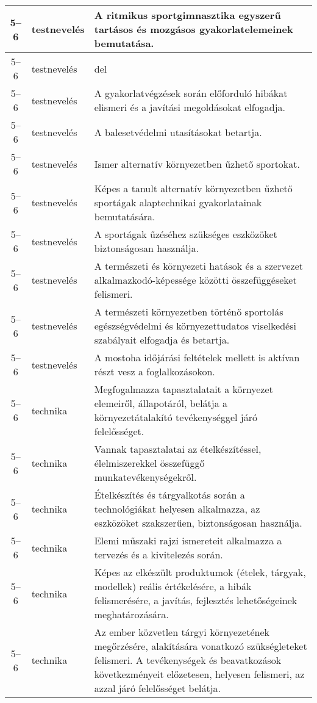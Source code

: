 \begin{small}
\begin{longtable}{c | p{2cm} |  p{11cm} }
              5--6 & testnevelés & A ritmikus sportgimnasztika egyszerű tartásos és mozgásos gyakorlatelemeinek bemutatása. \\ \hline
              5--6 & testnevelés & del
 \\ \hline
              5--6 & testnevelés & A gyakorlatvégzések során előforduló hibákat elismeri és a javítási megoldásokat elfogadja. \\ \hline
              5--6 & testnevelés & A balesetvédelmi utasításokat betartja. \\ \hline
              5--6 & testnevelés & Ismer alternatív környezetben űzhető sportokat. \\ \hline
              5--6 & testnevelés & Képes a tanult alternatív környezetben űzhető sportágak alaptechnikai gyakorlatainak bemutatására. \\ \hline
              5--6 & testnevelés & A sportágak űzéséhez szükséges eszközöket biztonságosan használja. \\ \hline
              5--6 & testnevelés & A természeti és környezeti hatások és a szervezet alkalmazkodó-képessége közötti összefüggéseket felismeri. \\ \hline
              5--6 & testnevelés & A természeti környezetben történő sportolás egészségvédelmi és környezettudatos viselkedési szabályait elfogadja és betartja. \\ \hline
              5--6 & testnevelés & A mostoha időjárási feltételek mellett is aktívan részt vesz a foglalkozásokon. \\ \hline
              5--6 & technika & Megfogalmazza tapasztalatait a környezet elemeiről, állapotáról, belátja a környezetátalakító tevékenységgel járó felelősséget. \\ \hline
              5--6 & technika & Vannak tapasztalatai az ételkészítéssel, élelmiszerekkel összefüggő munkatevékenységekről. \\ \hline
              5--6 & technika & Ételkészítés és tárgyalkotás során a technológiákat helyesen alkalmazza, az eszközöket szakszerűen, biztonságosan használja. \\ \hline
              5--6 & technika & Elemi műszaki rajzi ismereteit alkalmazza a tervezés és a kivitelezés során. \\ \hline
              5--6 & technika & Képes az elkészült produktumok (ételek, tárgyak, modellek) reális értékelésére, a hibák felismerésére, a javítás, fejlesztés lehetőségeinek meghatározására. \\ \hline
              5--6 & technika & Az ember közvetlen tárgyi környezetének megőrzésére, alakítására vonatkozó szükségleteket felismeri. A tevékenységek és beavatkozások következményeit előzetesen, helyesen felismeri, az azzal járó felelősséget belátja. \\ \hline

\end{longtable}
\end{small}
